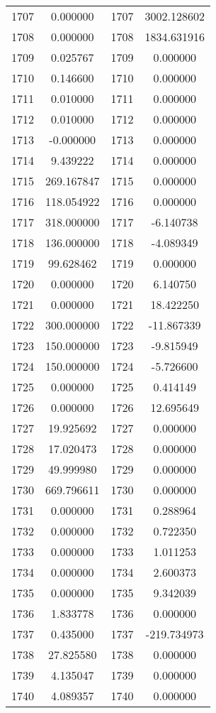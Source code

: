 \documentclass[12pt]{article}
\begin{document}
\begin{longtable}{@{}cccc@{}}
1707 & 0.000000 & 1707 & 3002.128602 \\
1708 & 0.000000 & 1708 & 1834.631916 \\
1709 & 0.025767 & 1709 & 0.000000 \\
1710 & 0.146600 & 1710 & 0.000000 \\
1711 & 0.010000 & 1711 & 0.000000 \\
1712 & 0.010000 & 1712 & 0.000000 \\
1713 & -0.000000 & 1713 & 0.000000 \\
1714 & 9.439222 & 1714 & 0.000000 \\
1715 & 269.167847 & 1715 & 0.000000 \\
1716 & 118.054922 & 1716 & 0.000000 \\
1717 & 318.000000 & 1717 & -6.140738 \\
1718 & 136.000000 & 1718 & -4.089349 \\
1719 & 99.628462 & 1719 & 0.000000 \\
1720 & 0.000000 & 1720 & 6.140750 \\
1721 & 0.000000 & 1721 & 18.422250 \\
1722 & 300.000000 & 1722 & -11.867339 \\
1723 & 150.000000 & 1723 & -9.815949 \\
1724 & 150.000000 & 1724 & -5.726600 \\
1725 & 0.000000 & 1725 & 0.414149 \\
1726 & 0.000000 & 1726 & 12.695649 \\
1727 & 19.925692 & 1727 & 0.000000 \\
1728 & 17.020473 & 1728 & 0.000000 \\
1729 & 49.999980 & 1729 & 0.000000 \\
1730 & 669.796611 & 1730 & 0.000000 \\
1731 & 0.000000 & 1731 & 0.288964 \\
1732 & 0.000000 & 1732 & 0.722350 \\
1733 & 0.000000 & 1733 & 1.011253 \\
1734 & 0.000000 & 1734 & 2.600373 \\
1735 & 0.000000 & 1735 & 9.342039 \\
1736 & 1.833778 & 1736 & 0.000000 \\
1737 & 0.435000 & 1737 & -219.734973 \\
1738 & 27.825580 & 1738 & 0.000000 \\
1739 & 4.135047 & 1739 & 0.000000 \\
1740 & 4.089357 & 1740 & 0.000000 \\

\end{longtable}
\end{document}
